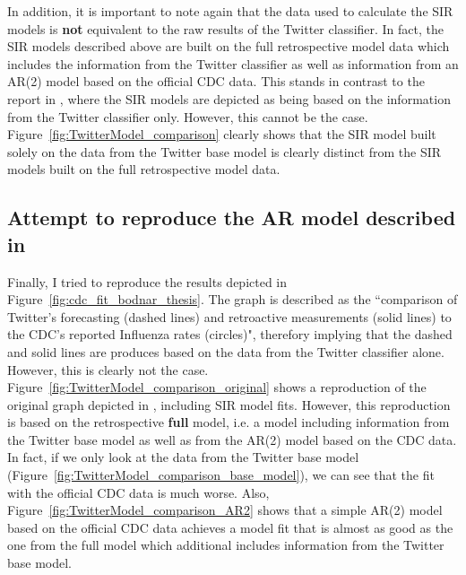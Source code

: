 \documentclass[11pt, a4paper]{report}\usepackage[]{graphicx}\usepackage[]{color}
\begin{document}
In addition, it is important to note again that the data used to calculate the SIR models is \textbf{not} equivalent to the raw results of the Twitter classifier. In fact, the SIR models described above are built on the full retrospective model data which includes the information from the Twitter classifier as well as information from an AR(2) model based on the official CDC data. This stands in contrast to the report in \citep{bodnar_data_2015}, where the SIR models are depicted as being based on the information from the Twitter classifier only. However, this cannot be the case. Figure~\ref{fig:TwitterModel_comparison} clearly shows that the SIR model built solely on the data from the Twitter base model is clearly distinct from the SIR models built on the full retrospective model data.  

\subsection{Attempt to reproduce the AR model described in \citep{bodnar_data_2015}}
Finally, I tried to reproduce the results depicted in Figure~\ref{fig:cdc_fit_bodnar_thesis}. The graph is described as the ``comparison of Twitter's forecasting (dashed lines) and retroactive measurements (solid lines) to the CDC's reported Influenza rates (circles)", therefory implying that the dashed and solid lines are produces based on the data from the Twitter classifier alone. However, this is clearly not the case. Figure~\ref{fig:TwitterModel_comparison_original} shows a reproduction of the original graph depicted in \citep{bodnar_data_2015}, including SIR model fits. However, this reproduction is based on the retrospective \textbf{full} model, i.e. a model including information from the Twitter base model as well as from the AR(2) model based on the CDC data. In fact, if we only look at the data from the Twitter base model (Figure~\ref{fig:TwitterModel_comparison_base_model}), we can see that the fit with the official CDC data is much worse. Also, Figure~\ref{fig:TwitterModel_comparison_AR2} shows that a simple AR(2) model based on the official CDC data achieves a model fit that is almost as good as the one from the full model which additional includes information from the Twitter base model.
\end{document}
